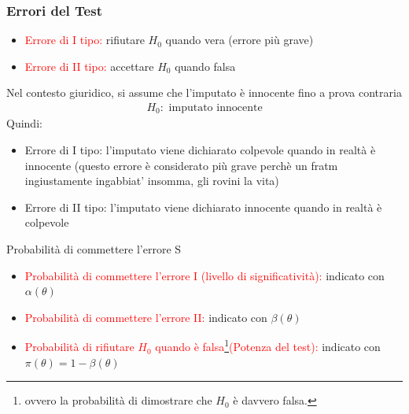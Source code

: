 \documentclass{article}  %
\theoremstyle{definition}
\begin{document}
\subsubsection{Errori del Test}
\begin{itemize}
	\item \textcolor{red}{Errore di I tipo:} rifiutare $H_0$ quando vera (errore più grave)
	\item \textcolor{red}{Errore di II tipo:} accettare $H_0$ quando falsa
\end{itemize}
\begin{esempio}[Esempio]
	Nel contesto giuridico, si assume che l'imputato è innocente fino a prova contraria
	\begin{align*}
		H_0: \text{ imputato innocente}
	\end{align*}
	Quindi:
	\begin{itemize}
		\item Errore di I tipo: l'imputato viene dichiarato colpevole quando in realtà è innocente (questo errore è considerato più grave perchè un fratm ingiustamente ingabbiat' insomma, gli rovini
		      la vita)
		\item Errore di II tipo: l'imputato viene dichiarato innocente quando in realtà è colpevole
	\end{itemize}
\end{esempio}
\begin{theorem}{Probabilità di commettere l'errore}
	S
	\begin{itemize}
		\item \textcolor{red}{Probabilità di commettere l'errore I (livello di significatività):} indicato con $\alpha(\theta)$
		\item \textcolor{red}{Probabilità di commettere l'errore II:} indicato con $\beta(\theta)$
		\item \textcolor{red}{Probabilità di rifiutare $H_0$ quando è falsa\footnote{
				      ovvero la probabilità di dimostrare che $H_0$ è davvero falsa.
			      }(Potenza del test):} indicato con $\pi(\theta)= 1-\beta(\theta)$
	\end{itemize}
\end{theorem}
\end{document}
